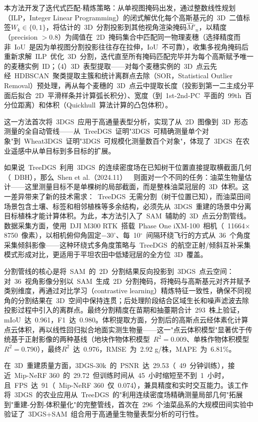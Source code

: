 本方法开发了迭代式匹配-精炼策略：从单视图掩码出发，通过整数线性规划（ILP，Integer Linear Programming）的闭式解优化每个高斯基元的~3D~二值标签$W_k \in \{0,1\}$，将估计的~3D~分割投影到其他视角渲染掩码$\hat{M}'_n$，以精度（precision $> 0.8$）为阈值在~2D~掩码集合中匹配同一物理麦穗（选择精度而非~IoU~是因为单视图分割投影往往存在拉伸，IoU~不可靠），收集多视角掩码后重新求解~ILP~优化~3D~分割，迭代直至所有掩码匹配完毕并为每个高斯赋予唯一的麦穗实例~ID；（4）3D~表型提取——对每个麦穗实例的~3D~点云先经~HDBSCAN~聚类提取主簇和统计离群点去除（SOR，Statistical Outlier Removal）预处理，再从每个麦穗的~3D~点云中提取长度（投影到第一二主成分平面后拟合~2D~平滑样条并计算弧长积分）、宽度（到~1st-2nd-PC~平面的~99th~百分位距离）和体积（Quickhull~算法计算的凸包体积）。

这一方法首次将~3DGS~应用于高通量表型分析，实现了从~2D~图像到~3D~形态测量的全自动管线——从~TreeDGS~证明"3DGS~可精确测量单个对象"到~Wheat3DGS~证明"3DGS~可规模化测量数百个对象"，体现了~3DGS~在农业遥感中从单目标到多目标的扩展。

如果说~TreeDGS~利用~3DGS~的连续密度场在已知树干位置直接提取横截面几何（~DBH），那么~Shen et al.（2024.11）~\cite{2411_08453}~则面对一个不同的任务：油菜生物量估计——这里测量目标不是单棵树的局部截面，而是整株油菜冠层的~3D~体积。这一差异带来了新的技术需求：~TreeDGS~无需分割（树干位置已知），而油菜田间场景包含土壤、标签和相邻植株等多余结构，必须先从~3DGS~重建的场景中分离目标植株才能计算体积。为此，本方法引入了~SAM~辅助的~3D~点云分割管线。数据采集方面，使用~DJI M300 RTK~搭载~Phase One iXM-100~相机（~11664$\times$8750~像素），以相机俯仰角固定$-30^{\circ}$、每~10$^{\circ}$~间隔环绕飞行的方式从~36~个角度采集倾斜影像——这种环绕式多角度策略与~TreeDGS~的航空正射/倾斜互补采集模式形成对比，更适用于平坦农田中低矮冠层的全方位~3D~覆盖。

分割管线的核心是将~SAM~的~2D~分割结果反向投影到~3DGS~点云空间：对~36~视角影像分别以~SAM~生成~2D~分割掩码，将掩码与高斯基元对齐并赋予类别维度，再通过对比学习（contrastive learning）精炼特征一致性，确保不同视角的分割结果在~3D~空间中保持连贯；后处理阶段结合区域生长和噪声滤波去除投影过程中引入的离群点。最终分割精度在苗期和抽薹期合计~293~株上验证，mIoU~达~0.961，F1~达~0.980。体积提取方面，分割后的高斯点云经体素化计算点云体积，再以线性回归拟合地面实测生物量——这一"点云体积模型"显著优于传统基于正射影像的两种基线（地块作物体积模型~$R^2=0.009$、单株作物体积模型~$R^2=0.790$），最终$R^2$~达~0.976，RMSE~为~2.92 g/株，MAPE~为~6.81\%。

在~3D~重建质量方面，3DGS-30k~的~PSNR~达~29.53（~49~分钟训练），接近~Mip-NeRF 360~的~29.72~但训练时间从~45~小时缩短至不到~1~小时，且~FPS~达~91（~Mip-NeRF 360~仅~0.074），兼具精度和实时交互能力。该工作将~3DGS~的农业应用从~TreeDGS~的"利用连续密度场精确测量局部几何"拓展到"重建-分割-体积量化"的完整管线，首次在~296~个油菜品系的大规模田间实验中验证了~3DGS+SAM~组合用于高通量生物量表型分析的可行性。

